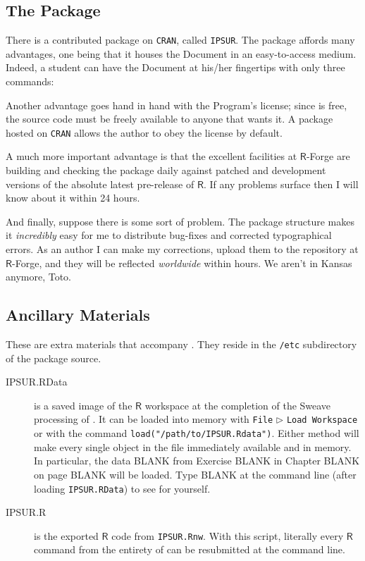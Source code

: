 \subsection*{The Package}

There is a contributed package on \texttt{CRAN}, called \texttt{IPSUR}. The package affords many advantages, one being that it houses the  Document in an easy-to-access medium. Indeed, a student can have the Document at his/her fingertips with only three commands:



Another advantage goes hand in hand with the Program's license; since \IPSUR is free, the source code must be freely available to anyone that wants it. A package hosted on \texttt{CRAN} allows the author to obey the license by default.

A much more important advantage is that the excellent facilities at \(\mathsf{R}\)-Forge are building and checking the package daily against patched and development versions of the absolute latest pre-release of \(\mathsf{R}\). If any problems surface then I will know about it within 24 hours.

And finally, suppose there is some sort of problem. The package structure makes it \emph{incredibly} easy for me to distribute bug-fixes and corrected typographical errors. As an author I can make my corrections, upload them to the repository at \(\mathsf{R}\)-Forge, and they will be reflected \emph{worldwide} within hours. We aren't in Kansas anymore, Toto.

\subsection*{Ancillary Materials}

These are extra materials that accompany \IPSUR. They reside in the \texttt{/etc} subdirectory of the package source. 

\begin{description}
\item[IPSUR.RData] is a saved image of the \(\mathsf{R}\) workspace at the completion of the Sweave processing of \IPSUR. It can be loaded into memory with \texttt{File} \(\triangleright\) \texttt{Load Workspace} or with the command \texttt{load("/path/to/IPSUR.Rdata")}. Either method will make every single object in the file immediately available and in memory. In particular, the data BLANK from Exercise BLANK in Chapter BLANK on page BLANK will be loaded. Type BLANK at the command line (after loading \texttt{IPSUR.RData}) to see for yourself.
\item[IPSUR.R] is the exported \(\mathsf{R}\) code from \texttt{IPSUR.Rnw}. With this script, literally every \(\mathsf{R}\) command from the entirety of \IPSUR can be resubmitted at the command line.
\end{description}

